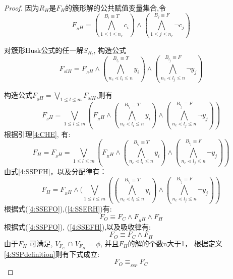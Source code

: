 \begin{proof}
因为${R_H}$是$F_H$的簇形解的公共赋值变量集合,令
\begin{equation}\label{4:SSERH}
F_{_RH}=
(\bigwedge_{1\leqslant i\leqslant n_c}^{B_i\equiv T} c_i)\wedge
(\bigwedge_{1\leqslant j\leqslant n_c}^{B_j\equiv F}\neg c_j)
\end{equation}

对簇形Husk公式的任一解$S_{H_l}$, 构造公式
\begin{equation}\label{4:SSPRH}
F_{slH}=F_{_RH}\wedge
(\bigwedge_{n_c\lessdot l_i\leqslant n}^{B_{l_i}\equiv T} y_i)\wedge
(\bigwedge_{n_c\lessdot l_j\leqslant n}^{B_{l_j}\equiv F}\neg y_j)
\end{equation}

构造公式$F_{_SH}=\bigvee_{1\leqslant l\leqslant m}F_{slH}$,则有
\begin{equation}
F_{_SH}=\bigvee_{1\leqslant l\leqslant m}(F_{_RH}\wedge
(\bigwedge_{n_c\lessdot l_i\leqslant n}^{B_{l_i}\equiv T} y_i)\wedge
(\bigwedge_{n_c\lessdot l_j\leqslant n}^{B_{l_j}\equiv F}\neg y_j))
\end{equation}
根据引理\ref{4:CHE}, 有:
\begin{equation}\label{4:SSPFH}
F_H=F_{_SH}=\bigvee_{1\leqslant l\leqslant m}(F_{_RH}\wedge
(\bigwedge_{n_c\lessdot l_i\leqslant n}^{B_{l_i}\equiv T} y_i)\wedge
(\bigwedge_{n_c\lessdot l_j\leqslant n}^{B_{l_j}\equiv F}\neg y_j))
\end{equation}
由式\ref{4:SSPFH}，以及分配律有：
\begin{equation}\label{4:SSEFH}
F_H=F_{_RH}\wedge (\bigvee_{1\leqslant l\leqslant m}(
(\bigwedge_{n_c\lessdot l_i\leqslant n}^{B_{l_i}\equiv T} y_i)\wedge
(\bigwedge_{n_c\lessdot l_j\leqslant n}^{B_{l_j}\equiv F}\neg y_j))
\end{equation}
根据式(\ref{4:SSEFO}),(\ref{4:SSERH})有:
\begin{equation}\label{4:SSPFO}
F_O\equiv F_C \wedge F_{_RH}\wedge F_H
\end{equation}
根据式(\ref{4:SSPFO}), (\ref{4:SSEFH}),以及吸收律有:
\begin{equation}\label{4:SSEEND}
F_O\equiv F_C \wedge F_H
\end{equation}
由于$F_H$ 可满足, $V_{F_C}$ $\cap$ $V_{F_H}$ = $\phi$, 并且$F_H$的解的个数n大于1，
根据定义\ref{4:SSPdefinition}则有下式成立:
\begin{equation}
F_O\equiv_{_{SSP}}  F_C
\end{equation}
\end{proof}

